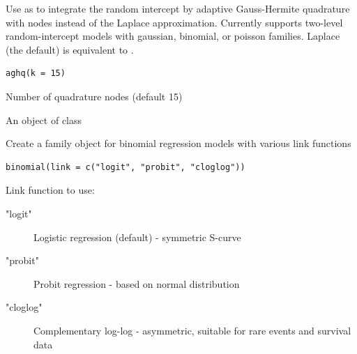 \documentclass[a4paper]{book}
\begin{document}
%
\begin{Description}
Use as  to integrate the random
intercept by adaptive Gauss-Hermite quadrature with  nodes
instead of the Laplace approximation. Currently supports two-level
random-intercept models with gaussian, binomial, or poisson families.
Laplace (the default) is equivalent to .
\end{Description}
%
\begin{Usage}
\begin{verbatim}
aghq(k = 15)
\end{verbatim}
\end{Usage}
%
\begin{Arguments}
\begin{ldescription}
\item[\code{k}] Number of quadrature nodes (default 15)
\end{ldescription}
\end{Arguments}
%
\begin{Value}
An object of class 
\end{Value}
%
\begin{Description}
Create a family object for binomial regression models with various link functions
\end{Description}
%
\begin{Usage}
\begin{verbatim}
binomial(link = c("logit", "probit", "cloglog"))
\end{verbatim}
\end{Usage}
%
\begin{Arguments}
\begin{ldescription}
\item[\code{link}] Link function to use:
\begin{description}

\item["logit"] Logistic regression (default) - symmetric S-curve
\item["probit"] Probit regression - based on normal distribution
\item["cloglog"] Complementary log-log - asymmetric, suitable for rare events and survival data

\end{description}

\end{ldescription}
\end{Arguments}
\end{document}
